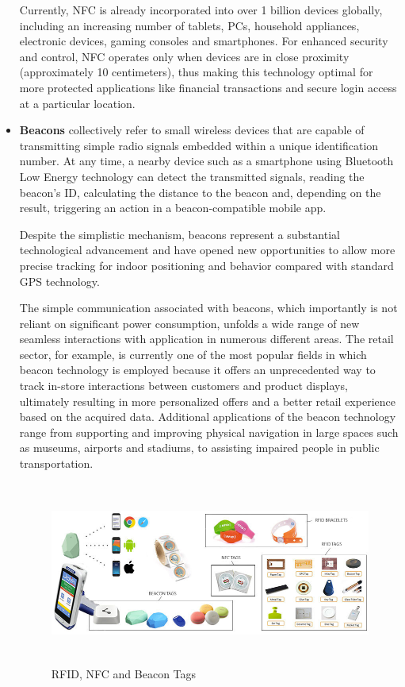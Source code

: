 \begin{itemize}
  Currently, NFC is already incorporated into over 1 billion devices globally, including an increasing number of tablets, PCs, household appliances, electronic devices, gaming consoles and smartphones. For enhanced security and control, NFC operates only when devices are in close proximity (approximately 10 centimeters), thus making this technology optimal for more protected applications like financial transactions and secure login access at a particular location. 
 
  \item \textbf{Beacons} \label{beacons} collectively refer to small wireless devices that are capable of transmitting simple radio signals embedded within a unique identification number. At any time, a nearby device such as a smartphone using Bluetooth Low Energy technology can detect the transmitted signals, reading the beacon’s ID, calculating the distance to the beacon and, depending on the result, triggering an action in a beacon-compatible mobile app. 
  
  Despite the simplistic mechanism, beacons represent a substantial technological advancement and have opened new opportunities to allow more precise tracking for indoor positioning and behavior compared with standard GPS technology.
  
  The simple communication associated with beacons, which importantly is not reliant on significant power consumption, unfolds a wide range of new seamless interactions with application in numerous different areas. The retail sector, for example, is currently one of the most popular fields in which beacon technology is employed because it offers an unprecedented way to track in-store interactions between customers and product displays, ultimately resulting in more personalized offers and a better retail experience based on the acquired data. Additional applications of the beacon technology range from supporting and improving physical navigation in large spaces such as museums, airports and stadiums, to assisting impaired people in public transportation.

  \vspace{0.5cm}
  \begin{figure}[htbp]
    \centering
      \includegraphics[height=6cm]{images/iot-devices.jpg}
    \caption{RFID, NFC and Beacon Tags}
    \label{fig:devices}
  \end{figure}
  \vspace{0.5cm}


\end{itemize}
